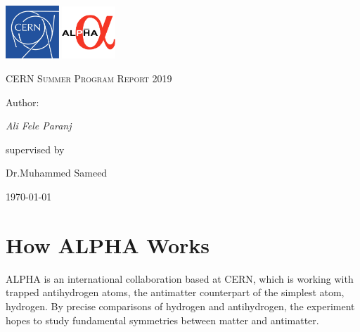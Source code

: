 \documentclass[12pt,a4paper]{article}
\begin{document}
\begin{titlepage}
	\centering
	\includegraphics[width=0.15\textwidth]{cern}\hspace{50mm}
\includegraphics[width=0.15\textwidth]{Alpha}	
	
	\par\vspace{1cm}
	{\scshape\LARGE CERN Summer Program Report 2019 \par}
	\vspace{1cm}
	
	\vspace{1.5cm}
	
	\vspace{2cm}
	\begin{Large}
	Author:
	\end{Large} \par
	{\Large\itshape Ali Fele Paranj \par}
	\vfill
	supervised by\par
	Dr.Muhammed Sameed

	\vfill

	{\large \today\par}
\end{titlepage}



\newpage

\tableofcontents

\newpage

\section{How ALPHA Works}

ALPHA is an international collaboration based at CERN, which is working with trapped antihydrogen atoms, the antimatter counterpart of the simplest atom, hydrogen. By precise comparisons of hydrogen and antihydrogen, the experiment hopes to study fundamental symmetries between matter and antimatter. 
\end{document}
